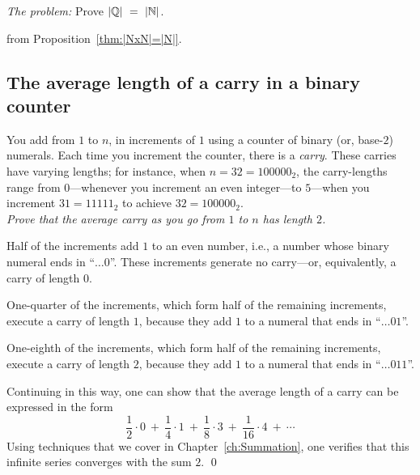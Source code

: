 \noindent \textit{The problem:}
Prove $|\Q| \ = \ |\N|$.
\medskip

from Proposition~\ref{thm:|NxN|=|N|}.


\subsection{The average length of a carry in a binary counter}

\medskip

%
You add from $1$ to $n$, in increments of $1$ using a counter of
binary (or, base-$2$) numerals.  Each time you increment the counter,
there is a {\it carry}.  These carries have varying lengths; for
instance, when $n = 32 = 100000_2$, the carry-lengths range
from $0$---whenever you increment an even integer---to $5$---when you
increment $31 = 11111_2$ to achieve $32 = 100000_2$. \\
{\em Prove that the average carry as you go from $1$ to $n$ has length $2$.}
\medskip


\noindent
Half of the increments add $1$ to an even number, i.e., a number whose
binary numeral ends in ``$ \ldots 0$''.  These increments generate no
carry---or, equivalently, a carry of length $0$.

\noindent
One-quarter of the increments, which form half of the remaining
increments, execute a carry of length $1$, because they add $1$ to a
numeral that ends in ``$ \ldots 01$''.

\noindent
One-eighth of the increments, which form half of the remaining
increments, execute a carry of length $2$, because they add $1$ to a
numeral that ends in ``$ \ldots 011$''.

Continuing in this way, one can show that the average length of a
carry can be expressed in the form
\[ 
\frac{1}{2} \cdot 0 \ + \ \frac{1}{4} \cdot 1 \ + \ \frac{1}{8} \cdot
3 \ + \ \frac{1}{16} \cdot 4 \ + \ \cdots
\]
Using techniques that we cover in Chapter~\ref{ch:Summation}, one
verifies that this infinite series converges with the sum $2$.  \qed


